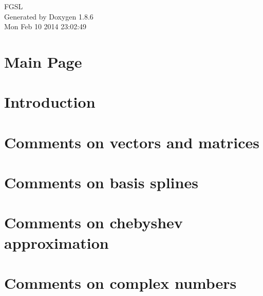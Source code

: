 \documentclass[twoside]{book}
\newcommand{\clearemptydoublepage}{%
  \newpage{\pagestyle{empty}\cleardoublepage}%
}
\begin{document}
\hypersetup{pageanchor=false}
\begin{titlepage}
\vspace*{7cm}
\begin{center}%
{\Large F\-G\-S\-L }\\
\vspace*{1cm}
{\large Generated by Doxygen 1.8.6}\\
\vspace*{0.5cm}
{\small Mon Feb 10 2014 23:02:49}\\
\end{center}
\end{titlepage}
\clearemptydoublepage
\tableofcontents
\clearemptydoublepage
{}
\hypersetup{pageanchor=true}

\chapter{Main Page}
\label{index}\hypertarget{index}{}
\chapter{Introduction}
\label{Introduction}
\hypertarget{Introduction}{}

\chapter{Comments on vectors and matrices}
\label{Comments_01on_01vectors_01and_01matrices}
\hypertarget{Comments_01on_01vectors_01and_01matrices}{}

\chapter{Comments on basis splines}
\label{Comments_01on_01basis_01splines}
\hypertarget{Comments_01on_01basis_01splines}{}

\chapter{Comments on chebyshev approximation}
\label{Comments_01on_01chebyshev_01approximation}
\hypertarget{Comments_01on_01chebyshev_01approximation}{}

\chapter{Comments on complex numbers}
\label{Comments_01on_01complex_01numbers}
\hypertarget{Comments_01on_01complex_01numbers}{}

\end{document}
